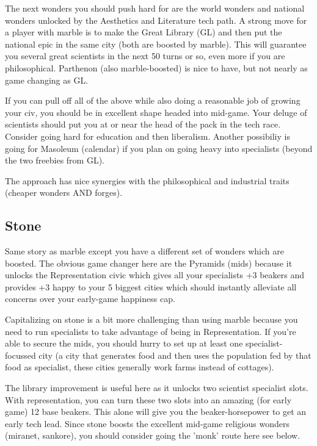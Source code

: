 \documentclass[10pt]{article}
\begin{document}
The next wonders you should push hard for are the world wonders and national wonders unlocked by the Aesthetics and
Literature tech path. A strong move for a player with marble is to make the Great Library (GL) and then put the national
epic in the same city (both are boosted by marble). This will guarantee you several great scientists in the next
50 turns or so, even more if you are philosophical. Parthenon (also marble-boosted) is nice to have, but not nearly as game changing as
GL.

If you can pull off all of the above while also doing a reasonable job of growing your civ, you should be
in excellent shape headed into mid-game. Your deluge of scientists should put you at or near the head of the pack
in the tech race. Consider going hard for education and then liberalism. Another possibiliy is going for Masoleum (calendar)
if you plan on going heavy into specialists (beyond the two freebies from GL).

The approach has nice synergies with the philosophical and industrial traits (cheaper wonders AND forges).

\subsection*{Stone}

Same story as marble except you have a different set of wonders which are boosted. The obvious game changer
here are the Pyramids (mids) because it unlocks the Representation civic which gives all your specialists +3
beakers and provides +3 happy to your 5 biggest cities which should instantly alleviate all concerns over
your early-game happiness cap.

Capitalizing on stone is a bit more challenging than using marble because you need to run specialists to
take advantage of being in Representation. If you're able to secure the mids, you should hurry to set up
at least one specialist-focussed city (a city that generates food and then uses the population fed by that
food as specialist, these cities generally work farms instead of cottages).

The library improvement is useful here as it unlocks two scientist specialist slots. With representation,
you can turn these two slots into an amazing (for early game) 12 base beakers. This alone will give you
the beaker-horsepower to get an early tech lead. Since stone boosts the excellent mid-game religious wonders
(miranet, sankore), you should consider going the 'monk' route here see below.
\end{document}
